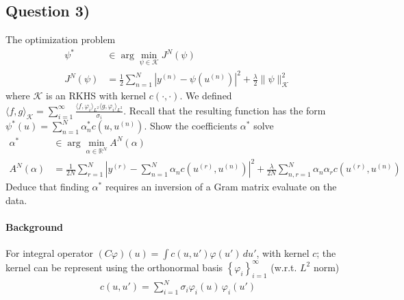 \documentclass[11pt,fleqn]{article}
\numberwithin{equation}{section}
\theoremstyle{definition}
\theoremstyle{definition}
\begin{document}
\subsection*{Question 3)} 
The optimization problem
\begin{align}
	\psi^* & \in \arg \min_{\psi \in \mathcal K} J^N(\psi) \label{eqn:opt}\\
	J^N(\psi) & = \frac{1}{2} \sum_{n=1}^N |y^{(n)} - \psi(u^{(n)}) |^2 + \frac{\lambda}{2} \|\psi\|_{\mathcal K}^2
\end{align}
where $\mathcal K$ is an RKHS with kernel $c(\cdot, \cdot)$. We defined $\langle f, g \rangle_{\mathcal K} = \sum_{i=1}^\infty \frac{\langle f, \varphi_i\rangle_{L^2} \langle g , \varphi_i \rangle_{L^2}}{\sigma_i}$.  Recall that the resulting function has the form $\psi^*(u) = \sum_{n=1}^N \alpha_n^* c(u, u^{(n)})$. Show the coefficients $\alpha^*$ solve
\begin{align}
	\alpha^* & \in \arg \min_{\alpha \in \mathbb R^N} A^N(\alpha)\\
	A^N(\alpha) & = \frac{1}{2N} \sum_{r=1}^N |y^{(r)} - \sum_{n=1}^N \alpha_n c(u^{(r)}, u^{(n)})|^2 + \frac{\lambda}{2N} \sum_{n,r=1}^N \alpha_n \alpha_r c(u^{(r)} , u^{(n)})
\end{align}
Deduce that finding $\alpha^*$ requires an inversion of a Gram matrix evaluate on the data.
\paragraph{Background}
\begin{theorem}
	 For integral operator $(C \varphi)(u) = \int c(u,u') \varphi(u') \, du'$, with kernel $c$; the kernel can be represent using the orthonormal basis $\left\{ \varphi_i \right\}_{i=1}^\infty$ (w.r.t. $L^2$ norm)
	\begin{align}
		c(u,u') = \sum_{i=1}^N \sigma_i \varphi_i(u) \, \varphi_i(u')
	\end{align}
\end{theorem}
\end{document}
